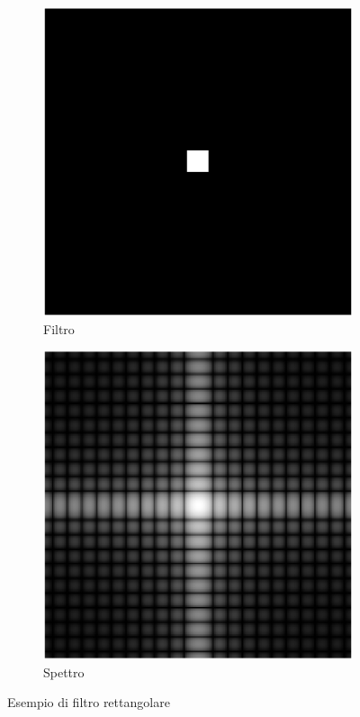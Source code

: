 \documentclass[../main.tex]{subfiles}
\begin{document}
\begin{figure}[ht]
	\centering
	\begin{subfigure}{0.4\linewidth}
		\centering
		\includegraphics[keepaspectratio, width=\linewidth]{images/box_spatial.png}
		\caption{Filtro}
	\end{subfigure}
	\hspace{20pt}
	\begin{subfigure}{0.4\linewidth}
		\centering
		\includegraphics[keepaspectratio, width=\linewidth]{images/box_spectrum.png}
		\caption{Spettro}
	\end{subfigure}
	\caption{Esempio di filtro rettangolare}
\end{figure}
\end{document}
